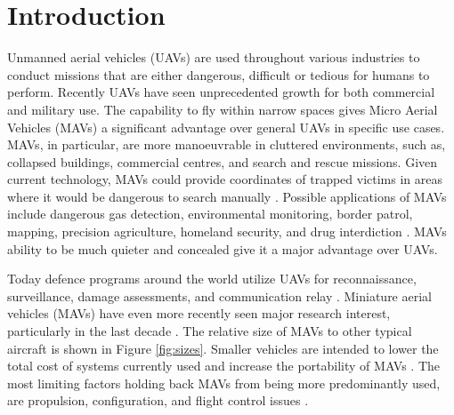 \graphicspath{{./Figs/}}

\chapter{Introduction} 
\label{sec:Background}




Unmanned aerial vehicles (UAVs) are used throughout various industries to conduct missions that are either dangerous, difficult or tedious for humans to perform. Recently UAVs have seen unprecedented growth for both commercial \cite{Liu2014} and military \cite{Chaturvedi2019} \cite{Fan2018} use. The capability to fly within narrow spaces gives Micro Aerial Vehicles (MAVs) a significant advantage over general UAVs in specific use cases. MAVs, in particular, are more manoeuvrable in cluttered environments, such as, collapsed buildings, commercial centres, and search and rescue missions. Given current technology, MAVs could provide coordinates of trapped victims in areas where it would be dangerous to search manually  \cite{Valavanis2007}. Possible applications of MAVs include dangerous gas detection, environmental monitoring, border patrol, mapping, precision agriculture, homeland security, and drug interdiction \cite{Liu2014} \cite{Valavanis2007}. MAVs ability to be much quieter and concealed give it a major advantage over UAVs.


Today defence programs around the world utilize UAVs for reconnaissance, surveillance, damage assessments, and communication relay \cite{Chaturvedi2019} \cite{Fan2018} \cite{Valavanis2007}. Miniature aerial vehicles (MAVs) have even more recently seen major research interest, particularly in the last decade \cite{Valavanis2007}.  The relative size of MAVs to other typical aircraft is shown in Figure \ref{fig:sizes}. Smaller vehicles are intended to lower the total cost of systems currently used and increase the portability of MAVs \cite{Stephen2022}. The most limiting factors holding back MAVs from being more predominantly used, are propulsion, configuration, and flight control issues \cite{Stephen2022}.


